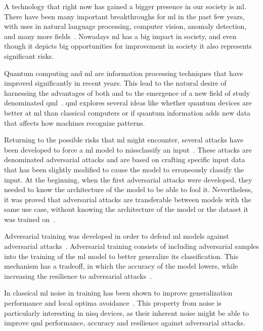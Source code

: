 A technology that right now has gained a bigger presence in our society is \ac{ml}.
There have been many important breakthroughs for \ac{ml} in the past few years, with
uses in natural language processing, computer vision, anomaly detection, and many
more fields~\cite{bommasani_opportunities_2022}. Nowadays \ac{ml} has a big impact
in society, and even though it depicts big opportunities for improvement in
society it also represents significant risks. \

Quantum computing and \ac{ml} are information processing techniques that have
improved significantly in recent years. This lead to the natural desire of
harnessing the advantages of both and to the emergence of a new field of study
denominated \ac{qml}~\cite{schuld_machine_2021}. \ac{qml} explores several ideas
like whether quantum devices are better at \ac{ml} than classical computers or
if quantum information adds new data that affects how machines recognize patterns. \

Returning to the possible risks that \ac{ml} might encounter, several attacks have
been developed to force a \ac{ml} model to missclassify an input~\cite{szegedy_intriguing_2014}.
These attacks are denominated adversarial attacks and are based on crafting specific
input data that has been slightly modified to cause the model to erroneously classify
the input. At the beginning, when the first adversarial attacks were developed,
they needed to know the architecture of the model to be able to fool it.
Nevertheless, it was proved that adversarial attacks are transferable between
models with the same use case, without knowing the architecture of the model or
the dataset it was trained on~\cite{papernot_transferability_2016}. \

Adversarial training was developed in order to defend \ac{ml} models against
adversarial attacks~\cite{goodfellow_explaining_2015, szegedy_intriguing_2014}.
Adversarial training consists of including adversarial samples into the training
of the \ac{ml} model to better generalize its classification. This mechanism
has a tradeoff, in which the accuracy of the model lowers, while increasing the
resilience to adversarial attacks~\cite{kurakin_adversarial_2017}. \

In classical \ac{ml} noise in training has been shown to improve generalization
performance and local optima avoidance~\cite{ciliberto_quantum_2018}. This
property from noise is particularly interesting in \ac{nisq} devices, as their
inherent noise might be able to improve \ac{qml} performance, accuracy and
resilience against adversarial attacks. \

